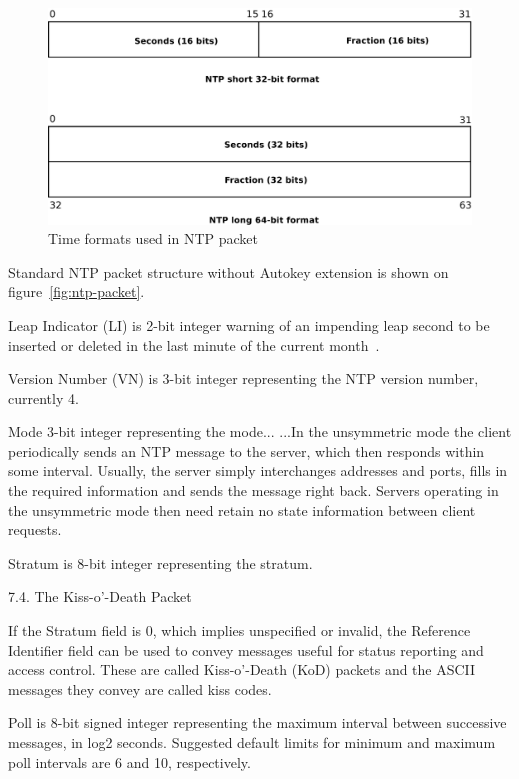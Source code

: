 \begin{figure}
	\centering
	\includegraphics[width=13cm,keepaspectratio]{fig/ntp-timestamps.pdf}
	\caption{Time formats used in NTP packet}
	\label{fig:ntp-timestamps}
	\bigskip
\end{figure}

Standard NTP packet structure without Autokey extension is shown on figure~\ref{fig:ntp-packet}.

Leap Indicator (LI) is 2-bit integer warning of an impending leap
second to be inserted or deleted in the last minute of the current
month~\cite{rfc5905}.

Version Number (VN) is 3-bit integer representing the NTP
version number, currently 4.

Mode 3-bit integer representing the mode...
...In the unsymmetric mode the
      client periodically sends an NTP message to the server, which then
      responds within some interval.  Usually, the server simply
      interchanges addresses and ports, fills in the required
      information and sends the message right back. Servers operating in
      the unsymmetric mode then need retain no state information between
      client requests.

Stratum is 8-bit integer representing the stratum.

7.4.  The Kiss-o'-Death Packet

   If the Stratum field is 0, which implies unspecified or invalid, the
   Reference Identifier field can be used to convey messages useful for
   status reporting and access control.  These are called Kiss-o'-Death
   (KoD) packets and the ASCII messages they convey are called kiss
   codes. 

Poll is 8-bit signed integer representing the maximum interval between
successive messages, in log2 seconds.
Suggested default limits for minimum and maximum poll intervals are 6 and 10, respectively.

